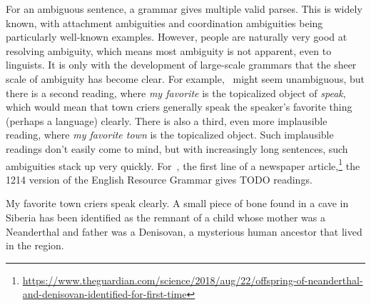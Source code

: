 \documentclass[output=paper,nonflat]{langsci/langscibook}
\begin{document}
For an ambiguous sentence,
a grammar gives multiple valid parses.
This is widely known, with attachment ambiguities and coordination ambiguities
being particularly well-known examples.
However, people are naturally very good at resolving ambiguity,
which means most ambiguity is not apparent, even to linguists.
It is only with the development of large-scale grammars that the sheer scale of ambiguity has become clear.
For example, ~might seem unambiguous,
but there is a second reading, where \textit{my favorite} is the topicalized object of \textit{speak},
which would mean that town criers generally speak the speaker's favorite thing (perhaps a language) clearly.
There is also a third, even more implausible reading, where \textit{my favorite town} is the topicalized object.
Such implausible readings don't easily come to mind,
but with increasingly long sentences, such ambiguities stack up very quickly.
For~, the first line of a newspaper article,\footnote{%
	\url{https://www.theguardian.com/science/2018/aug/22/offspring-of-neanderthal-and-denisovan-identified-for-first-time}
}
the 1214 version of the English Resource Grammar \citep{Flickinger2000a,Flickinger2011a-u}
gives TODO readings.


\begin{exe}
\ex\label{cl:ex:ambig-simple}
My favorite town criers speak clearly.
\ex\label{cl:ex:ambig-many}
A small piece of bone found in a cave in Siberia has been identified
as the remnant of a child whose mother was a Neanderthal and father was a Denisovan,
a mysterious human ancestor that lived in the region.
\end{exe}
\end{document}
